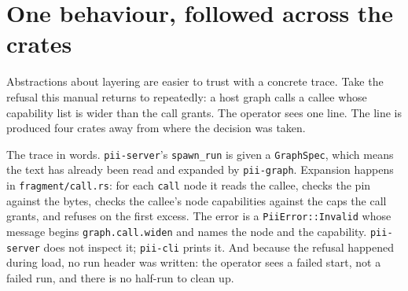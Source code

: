 \section{One behaviour, followed across the crates}

Abstractions about layering are easier to trust with a concrete trace. Take the refusal this manual
returns to repeatedly: a host graph calls a callee whose capability list is wider than the call
grants. The operator sees one line. The line is produced four crates away from where the decision
was taken.

\begin{center}
\end{center}

The trace in words. \texttt{pii-server}'s \texttt{spawn\_run} is given a \texttt{GraphSpec}, which
means the text has already been read and expanded by \texttt{pii-graph}. Expansion happens in
\texttt{fragment/call.rs}: for each \texttt{call} node it reads the callee, checks the pin against
the bytes, checks the callee's node capabilities against the caps the call grants, and refuses on
the first excess. The error is a \texttt{PiiError::Invalid} whose message begins
\texttt{graph.call.widen} and names the node and the capability. \texttt{pii-server} does not
inspect it; \texttt{pii-cli} prints it. And because the refusal happened during load, no run header
was written: the operator sees a failed start, not a failed run, and there is no half-run to clean
up.

